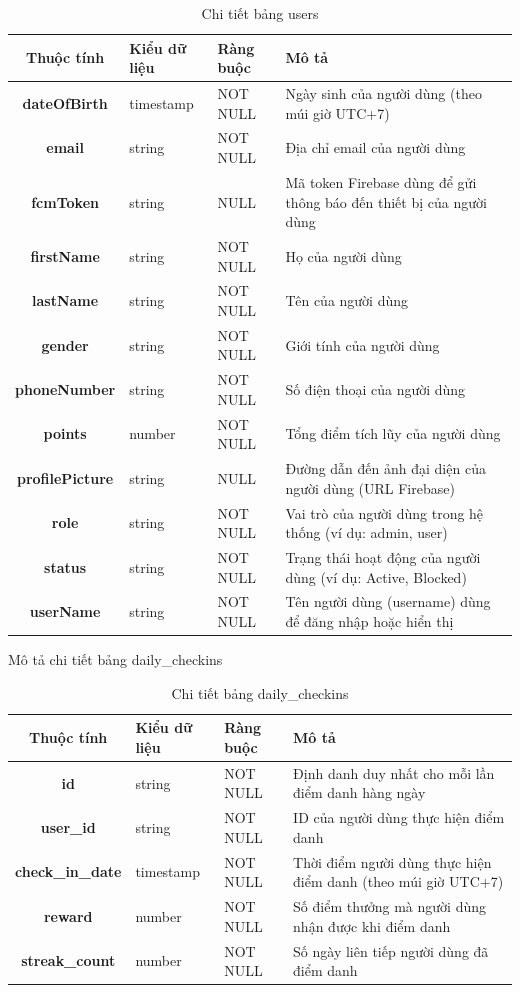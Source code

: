 \documentclass[../DoAn.tex]{subfiles}
\begin{document}
\begin{table}[H]
\centering
\begin{tabular}{|c|l|l|p{7cm}|}
\hline
\textbf{Thuộc tính} & \textbf{Kiểu dữ liệu} & \textbf{Ràng buộc} & \textbf{Mô tả} \\ \hline
\textbf{dateOfBirth} & timestamp & NOT NULL & Ngày sinh của người dùng (theo múi giờ UTC+7) \\ \hline
\textbf{email} & string & NOT NULL & Địa chỉ email của người dùng \\ \hline
\textbf{fcmToken} & string & NULL & Mã token Firebase dùng để gửi thông báo đến thiết bị của người dùng \\ \hline
\textbf{firstName} & string & NOT NULL & Họ của người dùng \\ \hline
\textbf{lastName} & string & NOT NULL & Tên của người dùng \\ \hline
\textbf{gender} & string & NOT NULL & Giới tính của người dùng \\ \hline
\textbf{phoneNumber} & string & NOT NULL & Số điện thoại của người dùng \\ \hline
\textbf{points} & number & NOT NULL & Tổng điểm tích lũy của người dùng \\ \hline
\textbf{profilePicture} & string & NULL & Đường dẫn đến ảnh đại diện của người dùng (URL Firebase) \\ \hline
\textbf{role} & string & NOT NULL & Vai trò của người dùng trong hệ thống (ví dụ: admin, user) \\ \hline
\textbf{status} & string & NOT NULL & Trạng thái hoạt động của người dùng (ví dụ: Active, Blocked) \\ \hline
\textbf{userName} & string & NOT NULL & Tên người dùng (username) dùng để đăng nhập hoặc hiển thị \\ \hline
\end{tabular}
\caption{Chi tiết bảng users}
\label{tab:usersTable}
\end{table}

Mô tả chi tiết bảng daily\_checkins

\begin{table}[H]
\centering
\begin{tabular}{|c|l|l|p{7cm}|}
\hline
\textbf{Thuộc tính} & \textbf{Kiểu dữ liệu} & \textbf{Ràng buộc} & \textbf{Mô tả} \\ \hline
\textbf{id} & string & NOT NULL & Định danh duy nhất cho mỗi lần điểm danh hàng ngày \\ \hline
\textbf{user\_id} & string & NOT NULL & ID của người dùng thực hiện điểm danh \\ \hline
\textbf{check\_in\_date} & timestamp & NOT NULL & Thời điểm người dùng thực hiện điểm danh (theo múi giờ UTC+7) \\ \hline
\textbf{reward} & number & NOT NULL & Số điểm thưởng mà người dùng nhận được khi điểm danh \\ \hline
\textbf{streak\_count} & number & NOT NULL & Số ngày liên tiếp người dùng đã điểm danh \\ \hline
\end{tabular}
\caption{Chi tiết bảng daily\_checkins}
\label{tab:daily_checkinsTable}
\end{table}
\end{document}
